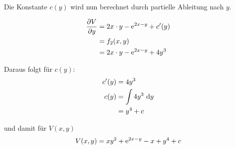 \documentclass[main.tex]{subfiles}
\begin{document}
Die Konstante $c(y)$ wird nun berechnet durch partielle Ableitung nach $y$.

\begin{align*}
	\frac{\partial V}{\partial y} &= 2x\cdot y - \text{\rmfamily\upshape e}^{2x - y} + c'(y) \\
								  &= f_2(x,y) \\
	     		 			      &= 2x \cdot y - \text{\rmfamily\upshape e}^{2x - y} + 4y^3
\end{align*}

Daraus folgt für $c(y)$:
\begin{align*}
	c'(y) &= 4y^3 \\
	c(y)  &= \int 4y^3 ~\mathrm{d}y \\
		  &= y^4 + c \\
\end{align*}

und damit für $V(x,y)$
\begin{align*}
	V(x,y) &= xy^2 + \text{\rmfamily\upshape e}^{2x - y} - x + y^4 + c \\
\end{align*}
\end{document}
